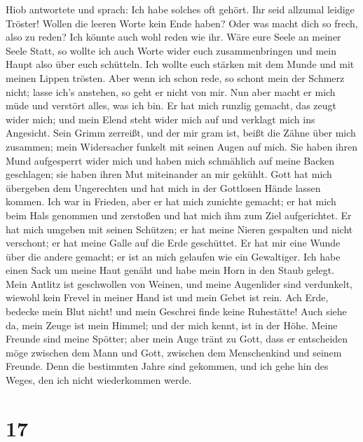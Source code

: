  Hiob antwortete und sprach:  Ich habe
solches oft gehört. Ihr seid allzumal leidige Tröster! 
Wollen die leeren Worte kein Ende haben? Oder was macht dich so frech,
also zu reden?  Ich könnte auch wohl reden wie ihr. Wäre
eure Seele an meiner Seele Statt, so wollte ich auch Worte wider euch
zusammenbringen und mein Haupt also über euch schütteln. 
Ich wollte euch stärken mit dem Munde und mit meinen Lippen trösten.
 Aber wenn ich schon rede, so schont mein der Schmerz
nicht; lasse ich's anstehen, so geht er nicht von mir. 
Nun aber macht er mich müde und verstört alles, was ich bin.
 Er hat mich runzlig gemacht, das zeugt wider mich; und
mein Elend steht wider mich auf und verklagt mich ins Angesicht.
 Sein Grimm zerreißt, und der mir gram ist, beißt die
Zähne über mich zusammen; mein Widersacher funkelt mit seinen Augen auf
mich.  Sie haben ihren Mund aufgesperrt wider mich und
haben mich schmählich auf meine Backen geschlagen; sie haben ihren Mut
miteinander an mir gekühlt.  Gott hat mich übergeben dem
Ungerechten und hat mich in der Gottlosen Hände lassen kommen.
 Ich war in Frieden, aber er hat mich zunichte gemacht;
er hat mich beim Hals genommen und zerstoßen und hat mich ihm zum Ziel
aufgerichtet.  Er hat mich umgeben mit seinen Schützen;
er hat meine Nieren gespalten und nicht verschont; er hat meine Galle
auf die Erde geschüttet.  Er hat mir eine Wunde über die
andere gemacht; er ist an mich gelaufen wie ein Gewaltiger.
 Ich habe einen Sack um meine Haut genäht und habe mein
Horn in den Staub gelegt.  Mein Antlitz ist geschwollen
von Weinen, und meine Augenlider sind verdunkelt, 
wiewohl kein Frevel in meiner Hand ist und mein Gebet ist rein.
 Ach Erde, bedecke mein Blut nicht! und mein Geschrei
finde keine Ruhestätte!  Auch siehe da, mein Zeuge ist
mein Himmel; und der mich kennt, ist in der Höhe.  Meine
Freunde sind meine Spötter; aber mein Auge tränt zu Gott,
 dass er entscheiden möge zwischen dem Mann und Gott,
zwischen dem Menschenkind und seinem Freunde.  Denn die
bestimmten Jahre sind gekommen, und ich gehe hin des Weges, den ich
nicht wiederkommen werde.

\hypertarget{section-16}{%
\section{17}\label{section-16}}

